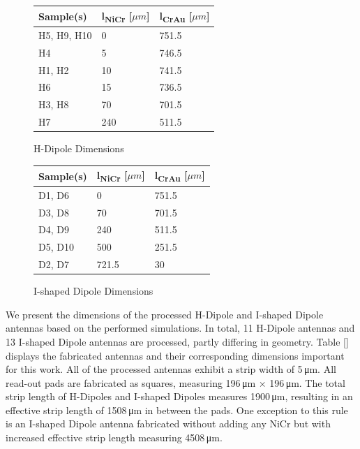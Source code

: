 \begin{figure}[htbp]
    \begin{subtable}[c]{0.45\textwidth}
        \centering
        \begin{tabular}{l|l|l}
        \toprule
        Sample(s) & l\textsubscript{NiCr} [$\mu m$] & l\textsubscript{CrAu} [$\mu m$] \\
        \midrule
        H5, H9, H10 & 0 & 751.5 \\
        H4 & 5 & 746.5 \\
        H1, H2 & 10 & 741.5 \\
        H6 & 15 & 736.5 \\
        H3, H8 & 70 & 701.5 \\
        H7 & 240 & 511.5 \\
        \bottomrule
        \end{tabular}
        \caption{\centering H-Dipole Dimensions}
        \label{tab:table}
    \end{subtable}
    \hspace{0.1em}
    \begin{subtable}[c]{0.45\textwidth}
        \centering
        \begin{tabular}{l|l|l}
        \toprule
        Sample(s) & l\textsubscript{NiCr} [$\mu m$] & l\textsubscript{CrAu} [$\mu m$] \\
        \midrule
        D1, D6 & 0 & 751.5 \\
        D3, D8 & 70 & 701.5 \\
        D4, D9 & 240 & 511.5 \\
        D5, D10 & 500 & 251.5 \\
        D2, D7 & 721.5 & 30 \\
        \bottomrule
        \end{tabular}
        \caption{\centering I-shaped Dipole Dimensions}
        \label{tab:table}
    \end{subtable}
    \caption{}
    \label{fig:sim_dimensions}
\end{figure}

We present the dimensions of the processed H-Dipole and I-shaped Dipole antennas based on the performed simulations. In total, 11 H-Dipole antennas and 13 I-shaped Dipole antennas are processed, partly differing in geometry. Table \ref{} displays the fabricated antennas and their corresponding dimensions important for this work. All of the processed antennas exhibit a strip width of \num{5}\,\si{\micro \meter}. All read-out pads are fabricated as squares, measuring \num{196}\,\si{\micro \meter} $\times$ \num{196}\,\si{\micro \meter}. The total strip length of H-Dipoles and I-shaped Dipoles measures \num{1900}\,\si{\micro \meter}, resulting in an effective strip length of \num{1508}\,\si{\micro \meter} in between the pads. One exception to this rule is an I-shaped Dipole antenna fabricated without adding any NiCr but with increased effective strip length measuring \num{4508}\,\si{\micro \meter}.

